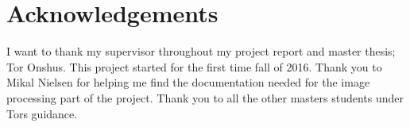 \section*{\centering Acknowledgements}
I want to thank my supervisor throughout my project report and master thesis; Tor Onshus. This project started for the first time fall of 2016. Thank you to Mikal Nielsen for helping me find the documentation needed for the image processing part of the project. Thank you to all the other masters students under Tors guidance.